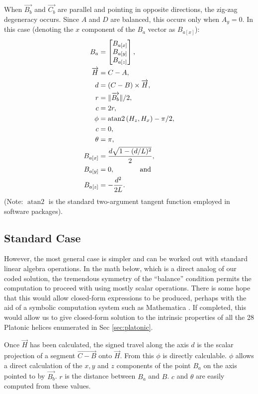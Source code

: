 \documentclass[mathematics,article,submit,pdftex,moreauthors]{Definitions/mdpi}
\DeclareMathOperator{\atantwo}{atan2}
\DeclarePairedDelimiter{\norm}{\lVert}{\rVert}
\begin{document}
When $\overrightarrow{B_b}$ and $\overrightarrow{C_b}$ are parallel and pointing in opposite directions,
the zig-zag degeneracy occurs. Since
$A$ and $D$ are balanced, this occurs only when $A_y = 0$.
In this case (denoting the $x$ component of the $B_a$ vector as $B_{a[x]}$):
\begin{align}
  B_{a} &= \begin{bmatrix} B_{a[x]} \\ B_{a[y]} \\ B_{a[z]}  \end{bmatrix}, \\
  \overrightarrow{H} &=  C - A, \\
  d &= (C - B) \times \overrightarrow{H}, \\
  r &= \norm{\overrightarrow{B_b}} / 2, \\
  c &= 2 r, \\
  \phi &= \atantwo{(H_z,H_x)} - \pi/2, \\
  c &= 0, \\
  \theta &= \pi, \\
  B_{a[x]} &= \frac{d\sqrt{1 - (d/L)^2}}{2}, \\
  B_{a[y]} &= 0, \text{ \hspace{3em} and} \\
  B_{a[z]} &= -\frac{d^2}{2L}.
\end{align}
(Note: $\atantwo$ is the standard two-argument tangent function employed in software packages).

\subsection{Standard Case}

However, the most general case is simpler and can be worked
out with standard linear algebra operations. In the math below,
which is a direct analog of our coded solution, the tremendous symmetry of the ``balance'' condition
permits the computation to proceed with
using mostly scalar operations. There is some hope that
this would allow closed-form expressions to be produced, perhaps
with the aid of a symbolic computation system such as
Mathematica \cite{Mathematica}. If completed, this would
allow us to give closed-form solution to the intrinsic properties
of all the 28 Platonic helices enumerated in Sec \ref{sec:platonic}.

Once $\overrightarrow{H}$ has been calculated, the signed travel along the axis $d$ is
the scalar projection of a segment $\overrightarrow{C - B}$ onto $\overrightarrow{H}$.
From this $\phi$ is directly calculable. $\phi$ allows
a direct calculation of the $x,y$ and $z$ components of the
point $B_a$ on the axis pointed to by $\overrightarrow{B_b}$.
$r$ is the distance between $B_a$ and $B$. $c$ and $\theta$
are easily computed from these values.
\end{document}
